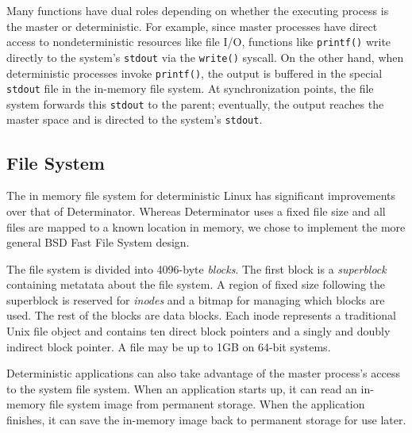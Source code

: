 Many functions have dual roles depending on whether the executing process is
the master or deterministic. For example, since master processes have direct
access to nondeterministic resources like file I/O, functions like
{\tt printf()} write directly to the system's {\tt stdout} via the {\tt write()}
syscall. On the other hand, when deterministic processes invoke {\tt printf()},
the output is buffered in the special {\tt stdout} file in the in-memory file
system. At synchronization points, the file system forwards this {\tt stdout}
to the parent; eventually, the output reaches the master space and is directed
to the system's {\tt stdout}.

\iffalse
Since master processes have direct access to the legacy Linux kernel API,
some functions server dual purposes.
Functions like {\tt printf()} are designed to access nondeterministic
(e.g. {\tt write()}) syscalls when the calling process is a
master process. Deterministic
processes use a separate version of {\tt printf()} that writes output to the
in memory file system. The file system is synced at synchronization points, and
the output is forwarded to the parent and eventually the console. At
synchronization points, parents forward {\tt stdin} input to children.
\fi

\subsection{File System} The in memory file system for deterministic Linux has
significant improvements over that of Determinator. Whereas Determinator uses a
fixed file size and all files are mapped to a known location in memory, we chose
to implement the more general BSD Fast File System design.

The file system is divided into 4096-byte \emph{blocks}. The first block is a
\emph{superblock} containing metatata about the file system. A region of fixed
size following the superblock is reserved for \emph{inodes} and a bitmap for
managing which blocks are used. The rest of the blocks are data blocks. Each
inode represents a traditional Unix file object and contains ten direct block
pointers and a singly and doubly indirect block pointer. A file may be up to
1GB on 64-bit systems.

Deterministic applications can also take advantage of the master process's
access to the system file system. When an application starts up, it can read
an in-memory file system image from permanent storage. When the application
finishes, it can save the in-memory image back to permanent storage for use
later.


